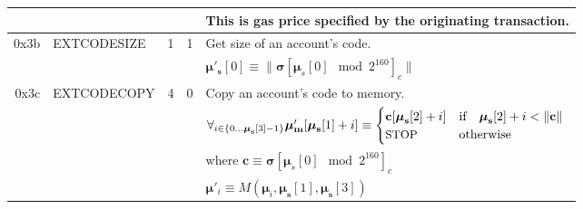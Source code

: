 \documentclass[9pt,oneside]{amsart}
\begin{document}
\begin{tabular*}{\columnwidth}[h]{rlrrl}
&&&& This is gas price specified by the originating transaction.\\
\midrule
0x3b & {\small EXTCODESIZE} & 1 & 1 & Get size of an account's code. \\
&&&& $\boldsymbol{\mu}'_\mathbf{s}[0] \equiv \lVert \boldsymbol{\sigma}[\boldsymbol{\mu}_s[0] \mod 2^{160}]_c \rVert$ \\
\midrule
0x3c & {\small EXTCODECOPY} & 4 & 0 & Copy an account's code to memory. \\
&&&& $\forall_{i \in \{ 0 \dots \boldsymbol{\mu}_\mathbf{s}[3] - 1\} } \boldsymbol{\mu}'_\mathbf{m}[\boldsymbol{\mu}_\mathbf{s}[1] + i ] \equiv
\begin{cases} \mathbf{c}[\boldsymbol{\mu}_\mathbf{s}[2] + i] & \text{if} \quad \boldsymbol{\mu}_\mathbf{s}[2] + i < \lVert \mathbf{c} \rVert \\ \text{\small STOP} & \text{otherwise} \end{cases}$\\
&&&& where $\mathbf{c} \equiv \boldsymbol{\sigma}[\boldsymbol{\mu}_s[0] \mod 2^{160}]_c$ \\
&&&& $\boldsymbol{\mu}'_i \equiv M(\boldsymbol{\mu}_i, \boldsymbol{\mu}_\mathbf{s}[1], \boldsymbol{\mu}_\mathbf{s}[3])$ \\
\bottomrule
\end{tabular*}
\end{document}
